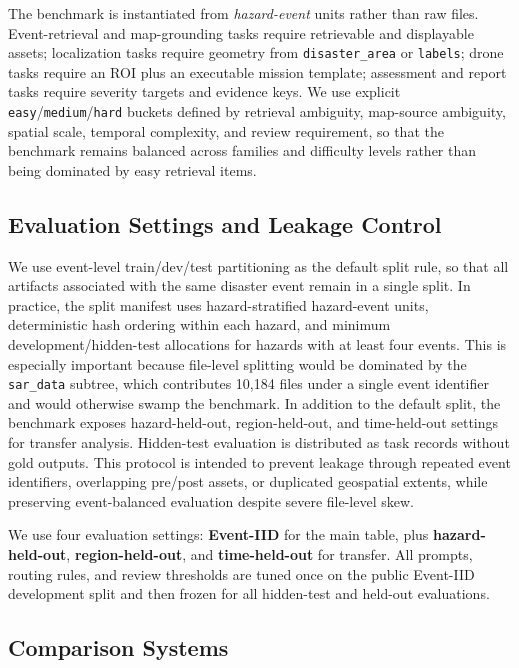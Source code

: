 \documentclass{article}
\newcommand{\datasetsarfiles}{10{,}184}
\begin{document}
The benchmark is instantiated from \emph{hazard-event} units rather than raw files. Event-retrieval and map-grounding tasks require retrievable and displayable assets; localization tasks require geometry from \texttt{disaster\_area} or \texttt{labels}; drone tasks require an ROI plus an executable mission template; assessment and report tasks require severity targets and evidence keys. We use explicit \texttt{easy}/\texttt{medium}/\texttt{hard} buckets defined by retrieval ambiguity, map-source ambiguity, spatial scale, temporal complexity, and review requirement, so that the benchmark remains balanced across families and difficulty levels rather than being dominated by easy retrieval items.

\subsection{Evaluation Settings and Leakage Control}

We use event-level train/dev/test partitioning as the default split rule, so that all artifacts associated with the same disaster event remain in a single split. In practice, the split manifest uses hazard-stratified hazard-event units, deterministic hash ordering within each hazard, and minimum development/hidden-test allocations for hazards with at least four events. This is especially important because file-level splitting would be dominated by the \texttt{sar\_data} subtree, which contributes \datasetsarfiles{} files under a single event identifier and would otherwise swamp the benchmark. In addition to the default split, the benchmark exposes hazard-held-out, region-held-out, and time-held-out settings for transfer analysis. Hidden-test evaluation is distributed as task records without gold outputs. This protocol is intended to prevent leakage through repeated event identifiers, overlapping pre/post assets, or duplicated geospatial extents, while preserving event-balanced evaluation despite severe file-level skew.

We use four evaluation settings: \textbf{Event-IID} for the main table, plus \textbf{hazard-held-out}, \textbf{region-held-out}, and \textbf{time-held-out} for transfer. All prompts, routing rules, and review thresholds are tuned once on the public Event-IID development split and then frozen for all hidden-test and held-out evaluations.

\subsection{Comparison Systems}
\label{sec:comparison-systems}
\end{document}
